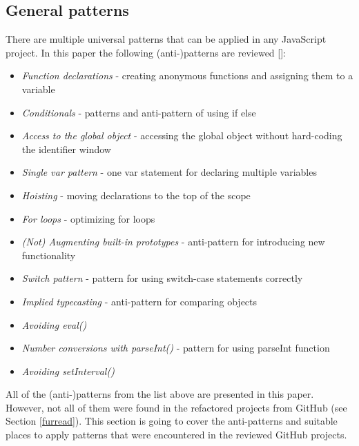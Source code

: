\documentclass{bioinfo}
\begin{document}
\begin{methods}

\section{General patterns}
There are multiple universal patterns that can be applied in any JavaScript project. In this paper the following (anti-)patterns are reviewed [\citealp{chuan}]:
\begin{itemize}
\item \textit{Function declarations} - creating anonymous functions and assigning them to a variable
\item \textit{Conditionals} - patterns and anti-pattern of using if else
\item \textit{Access to the global object} - accessing the global object without hard-coding the identifier window
\item \textit{Single var pattern} - one var statement for declaring multiple variables
\item \textit{Hoisting} - moving declarations to the top of the scope
\item \textit{For loops} - optimizing for loops
\item \textit{(Not) Augmenting built-in prototypes} - anti-pattern for introducing new functionality
\item \textit{Switch pattern} - pattern for using switch-case statements correctly
\item \textit{Implied typecasting} - anti-pattern for comparing objects
\item \textit{Avoiding eval()}
\item \textit{Number conversions with parseInt()} - pattern for using parseInt function
\item \textit{Avoiding setInterval()}
\end{itemize}
All of the (anti-)patterns from the list above are presented in this paper. However, not all of them were found in the refactored projects from GitHub (see Section \ref{furread}). This section is going to cover the anti-patterns and suitable places to apply patterns that were encountered in the reviewed GitHub projects.\\


\end{methods}
\end{document}
